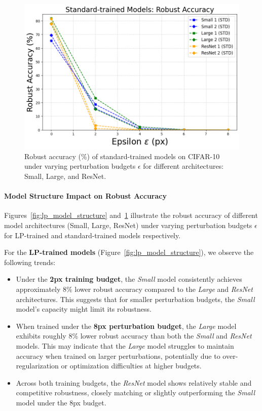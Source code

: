 \begin{figure}[htbp]
    \centering
    \includegraphics[width=0.80\linewidth]{images/STD_MODEL_STRUCTURE.png}
    \caption{Robust accuracy (\%) of standard-trained models on CIFAR-10 under varying perturbation budgets $\epsilon$ for different architectures: Small, Large, and ResNet.}
    \label{fig:std_model_structure}
\end{figure}

\paragraph{Model Structure Impact on Robust Accuracy}

Figures~\ref{fig:lp_model_structure} and~\ref{fig:std_model_structure} illustrate the robust accuracy of different model architectures (Small, Large, ResNet) under varying perturbation budgets $\epsilon$ for LP-trained and standard-trained models respectively.

For the \textbf{LP-trained models} (Figure~\ref{fig:lp_model_structure}), we observe the following trends:

\begin{itemize}
    \item Under the \textbf{2px training budget}, the \textit{Small} model consistently achieves approximately 8\% lower robust accuracy compared to the \textit{Large} and \textit{ResNet} architectures. This suggests that for smaller perturbation budgets, the \textit{Small} model’s capacity might limit its robustness.
    \item When trained under the \textbf{8px perturbation budget}, the \textit{Large} model exhibits roughly 8\% lower robust accuracy than both the \textit{Small} and \textit{ResNet} models. This may indicate that the \textit{Large} model struggles to maintain accuracy when trained on larger perturbations, potentially due to over-regularization or optimization difficulties at higher budgets.
    \item Across both training budgets, the \textit{ResNet} model shows relatively stable and competitive robustness, closely matching or slightly outperforming the \textit{Small} model under the 8px budget.
\end{itemize}

